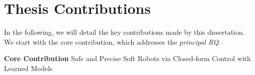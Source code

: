 \section{Thesis Contributions}\label{sec:introduction:contributions}

In the following, we will detail the key contributions made by this dissertation.
We start with the core contribution, which addresses the \emph{principal \gls{RQ}}.

\begin{titled-frame}{\textbf{Core Contribution}}
\noindent Safe and Precise Soft Robots via Closed-form Control with Learned Models
\end{titled-frame}
